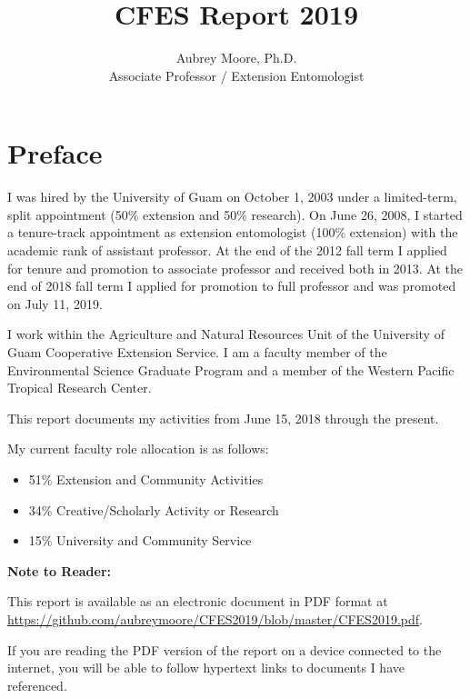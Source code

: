 \documentclass[12pt,english]{scrartcl}
\begin{document}
\title{CFES Report 2019}

\author{Aubrey Moore, Ph.D.\\
Associate Professor / Extension Entomologist}

\maketitle



\tableofcontents{}

\clearpage

\section{Preface}

I was hired by the University of Guam on October 1, 2003 under a limited-term,
split appointment (50\% extension and 50\% research). On June 26,
2008, I started a tenure-track appointment as extension entomologist
(100\% extension) with the academic rank of assistant professor. At
the end of the 2012 fall term I applied for tenure and promotion to associate professor and
received both in 2013. At the end of 2018 fall term I applied for promotion to
full professor and was promoted on July 11, 2019.

I work within the Agriculture and Natural Resources Unit of the University
of Guam Cooperative Extension Service. I am a faculty member of the
Environmental Science Graduate Program and a member of the Western
Pacific Tropical Research Center. 

This report documents my activities from June 15, 2018 through the present.

My current faculty role allocation is as follows:
\begin{itemize}
	\item 51\% Extension and Community Activities 
	\item 34\% Creative/Scholarly Activity or Research 
	\item 15\% University and Community Service
\end{itemize}
\textbf{Note to Reader:}

This report is available as an electronic document in PDF format at\\
\url{https://github.com/aubreymoore/CFES2019/blob/master/CFES2019.pdf}. 

If you are reading the PDF version of the report on a device connected
to the internet, you will be able to follow hypertext links to documents
I have referenced. 
\end{document}
